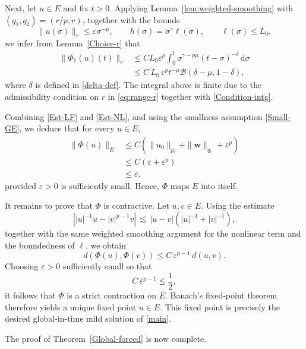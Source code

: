 \documentclass[12pt,reqno]{amsart}
\theoremstyle{plain}
\theoremstyle{definition}
\theoremstyle{remark}
\numberwithin{equation}{section}
\begin{document}
Next, let $u \in E$ and fix $t>0$. Applying Lemma~\ref{lem:weighted-smoothing} with $(q_1,q_2)=(r/p,r)$, together with the bounds
\[
\|u(\sigma)\|_{r} \le \varepsilon \sigma^{-\mu},
\qquad
h(\sigma)=\sigma^{\gamma}\ell(\sigma),
\qquad
\ell(\sigma)\le L_0,
\]
we infer from Lemma~\ref{Choice-r} that
\begin{equation} \label{Est-NL}
\begin{aligned}
\|\Phi_{1}(u)(t)\|_{r}
&\leq C L_{0}\varepsilon^{p}\int_{0}^{t}\sigma^{\gamma-p\mu}(t-\sigma)^{-\delta}\,\mathrm{d}\sigma \\
&\leq C\,L_{0}\,\varepsilon^{p}t^{-\mu}
\mathscr{B}\left(\delta-\mu,1-\delta\right),
\end{aligned}
\end{equation}
where $\delta$ is defined in \eqref{delta-def}. 
The integral above is finite due to the admissibility condition on $r$ in \eqref{eq:range-r} together with \eqref{Condition-intg}.

Combining \eqref{Est-LF} and \eqref{Est-NL}, and using the smallness assumption \eqref{Small-GE}, we deduce that for every $u \in E$,
\begin{equation}\label{eq:PhiE}
\begin{split}
\|\Phi(u)\|_{E}
&\leq C\left(\|u_{0}\|_{p_{c}} +\|\mathbf{w}\|_{q_{c}}+ \varepsilon^{p}\right)\\
&\leq C\left(\varepsilon+\varepsilon^{p}\right)\\
&\leq \varepsilon,
\end{split}
\end{equation}
provided $\varepsilon>0$ is sufficiently small. Hence, $\Phi$ maps $E$ into itself.

It remains to prove that $\Phi$ is contractive. Let $u,v \in E$. Using the estimate
$$
\left||u|^{-1}u-|v|^{p-1}v\right|\,\lesssim\,|u-v|\left(|u|^{-1}+|v|^{-1}\right),
$$
together with the same weighted smoothing argument for the nonlinear term and the boundedness of $\ell$, we obtain
\begin{equation}\label{eq:contrFinal}
d(\Phi(u), \Phi(v)) \leq C\,\varepsilon^{p-1}\,d(u,v).
\end{equation}
Choosing $\varepsilon>0$ sufficiently small so that
\[
C\,\varepsilon^{p-1}\le \frac12,
\]
it follows that $\Phi$ is a strict contraction on $E$. Banach's fixed-point theorem therefore yields a unique fixed point $u \in E$. This fixed point is precisely the desired global-in-time mild solution of \eqref{main}.

The proof of Theorem~\ref{Global-forced} is now complete.
\end{document}

